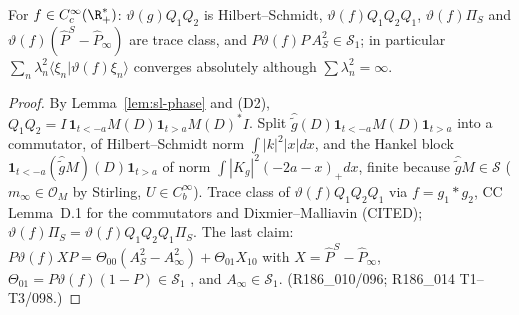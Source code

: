 \begin{lemma}\label{lem:sl-TC}
For $f\in C_c^\infty(\R_+^*)$: $\vartheta(g)Q_1Q_2$ is Hilbert--Schmidt, $\vartheta(f)Q_1Q_2Q_1$, $\vartheta(f)\Pi_S$ and
$\vartheta(f)(\widehat P^S-\widehat P_\infty)$ are trace class, and $P\vartheta(f)P\,A_S^2\in\mathcal S_1$; in particular
$\sum_n\lambda_n^2\langle\xi_n|\vartheta(f)\xi_n\rangle$ converges absolutely although $\sum\lambda_n^2=\infty$.
\end{lemma}
\begin{proof}
By Lemma~\ref{lem:sl-phase} and (D2), $Q_1Q_2=I\,\mathbf 1_{t<-a}M(D)\mathbf 1_{t>a}M(D)^*I$. Split
$\widehat{\tilde g}(D)\mathbf 1_{t<-a}M(D)\mathbf 1_{t>a}$ into a commutator, of Hilbert--Schmidt norm
$\int|k|^2|x|dx$, and the Hankel block $\mathbf 1_{t<-a}(\widehat{\tilde g}M)(D)\mathbf 1_{t>a}$ of norm
$\int|K_g|^2(-2a-x)_+dx$, finite because $\widehat{\tilde g}M\in\mathcal S$ ($m_\infty\in\mathcal O_M$ by Stirling,
$U\in C_b^\infty$). Trace class of $\vartheta(f)Q_1Q_2Q_1$ via $f=g_1*g_2$, CC Lemma~D.1 for the commutators
\cite{ConnesConsani2021} and Dixmier--Malliavin (CITED); $\vartheta(f)\Pi_S=\vartheta(f)Q_1Q_2Q_1\Pi_S$.
The last claim: $P\vartheta(f)XP=\Theta_{00}(A_S^2-A_\infty^2)+\Theta_{01}X_{10}$ with $X=\widehat P^S-\widehat P_\infty$,
$\Theta_{01}=P\vartheta(f)(1-P)\in\mathcal S_1$ \cite[Thm.~4.5]{Simon}, and $A_\infty\in\mathcal S_1$.
(R186\_010/096; R186\_014 T1--T3/098.)
\end{proof}

